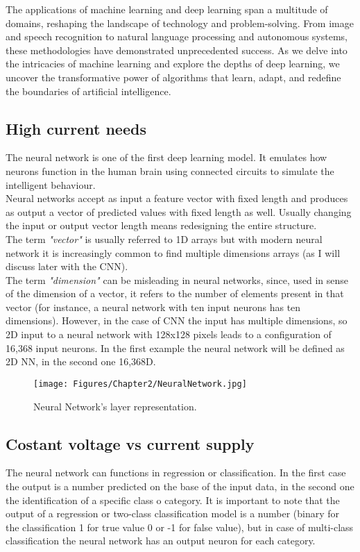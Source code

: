 The applications of machine learning and deep learning span a multitude of domains, reshaping the landscape of technology and problem-solving. From image and speech recognition to natural language processing and autonomous systems, these methodologies have demonstrated unprecedented success. As we delve into the intricacies of machine learning and explore the depths of deep learning, we uncover the transformative power of algorithms that learn, adapt, and redefine the boundaries of artificial intelligence.
\subsection{High current needs}
The neural network is one of the first deep learning model. It emulates how neurons function in the human brain using connected circuits to simulate the intelligent behaviour.\\
Neural networks accept as input a feature vector with fixed length and produces as output a vector of predicted values with fixed length as well. Usually changing the input or output vector length means redesigning the entire structure.\\
The term \textit{"vector"} is usually referred to 1D arrays but with modern neural network it is increasingly common to find multiple dimensions arrays (as I will discuss later with the CNN).\\
The term \textit{"dimension"} can be misleading in neural networks, since, used in sense of the dimension of a vector, it refers to the number of elements present in that vector (for instance, a neural network with ten input neurons has ten dimensions). However, in the case of CNN the input has multiple dimensions, so 2D input to a neural network with 128x128 pixels leads to a configuration of 16,368 input neurons. In the first example the neural network will be defined as 2D NN, in the second one 16,368D.

\begin{figure}[th]
    \centering
    \texttt{[image: Figures/Chapter2/NeuralNetwork.jpg]}
    \caption[Neural Network]{Neural Network's layer representation.}
    \label{fig:NeuralNetwork}
\end{figure}

\subsection{Costant voltage vs current supply}
The neural network can functions in regression or classification. In the first case the output is a number predicted on the base of the input data, in the second one the identification of a specific class o category. It is important to note that the output of a regression or two-class classification model is a number (binary for the classification 1 for true value 0 or -1 for false value), but in case of multi-class classification the neural network has an output neuron for each category. 


